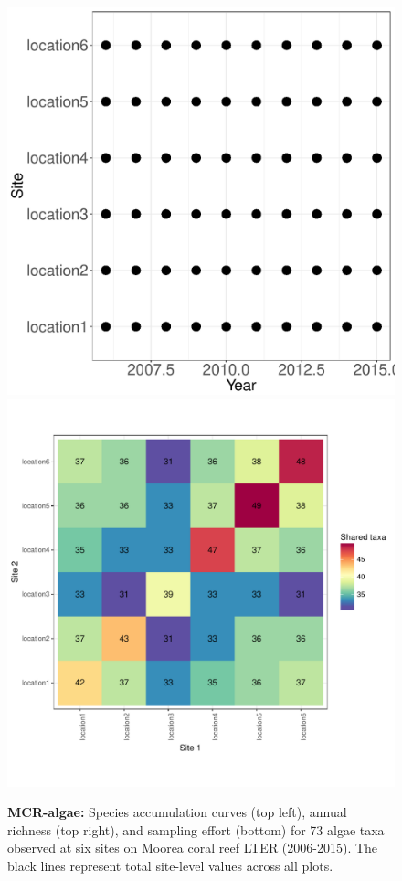 \documentclass[11pt, oneside]{article}
\begin{document}
\begin{figure}[h!]
\includegraphics[scale = 0.4]{mcr-algae-castorani_spatiotemporal_sampling_effort.pdf}
\includegraphics[scale = 0.4]{mcr-algae-castorani_spp_shared.pdf}
\caption{{\bf MCR-algae:} Species accumulation curves (top left),  annual richness (top right), and sampling effort (bottom)  for 73 algae taxa observed at six sites on Moorea coral reef LTER (2006-2015). The black lines represent total site-level values across all plots.}
\label{mcr-algae}
\end{figure}
\end{document}
